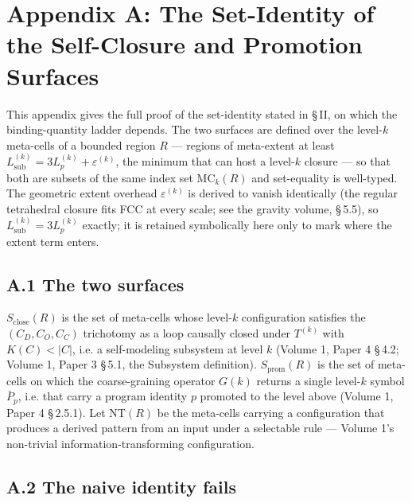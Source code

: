 \documentclass[11pt,oneside]{report}
\theoremstyle{definition}
\theoremstyle{remark}
\begin{document}
\section*{Appendix A: The Set-Identity of the Self-Closure and Promotion Surfaces}

This appendix gives the full proof of the set-identity stated in \S\,II,
on which the binding-quantity ladder depends. The two surfaces are defined
over the level-\ensuremath{k} meta-cells of a bounded region \ensuremath{R}
--- regions of meta-extent at least \ensuremath{L_{\mathrm{sub}}^{(k)} = 3 L_p^{(k)} + \varepsilon^{(k)}},
the minimum that can host a level-\ensuremath{k} closure --- so that both are
subsets of the same index set \ensuremath{\mathrm{MC}_k(R)} and set-equality
is well-typed. The geometric extent overhead \ensuremath{\varepsilon^{(k)}} is derived to
vanish identically (the regular tetrahedral closure fits FCC at every
scale; see the gravity volume, \S\,5.5), so \ensuremath{L_{\mathrm{sub}}^{(k)} = 3 L_p^{(k)}}
exactly; it is retained symbolically here only to mark where the extent
term enters.

\subsection*{A.1 The two surfaces}

\ensuremath{S_{\mathrm{close}}(R)} is the set of meta-cells whose level-\ensuremath{k}
configuration satisfies the \ensuremath{(C_D, C_O, C_C)} trichotomy as a loop
causally closed under \ensuremath{T^{(k)}} with \ensuremath{K(C) < |C|}, i.e.
a self-modeling subsystem at level \ensuremath{k} (Volume 1, Paper 4 \S\,4.2;
Volume 1, Paper 3 \S\,5.1, the Subsystem definition). \ensuremath{S_{\mathrm{prom}}(R)} is the set of meta-cells
on which the coarse-graining operator \ensuremath{G(k)} returns a single
level-\ensuremath{k} symbol \ensuremath{\bar{P}_p}, i.e. that carry a program
identity \ensuremath{p} promoted to the level above (Volume 1, Paper 4 \S\,2.5.1).
Let \ensuremath{\mathrm{NT}(R)} be the meta-cells carrying a configuration that
produces a derived pattern from an input under a selectable rule --- Volume 1's
non-trivial information-transforming configuration.

\subsection*{A.2 The naive identity fails}
\end{document}
